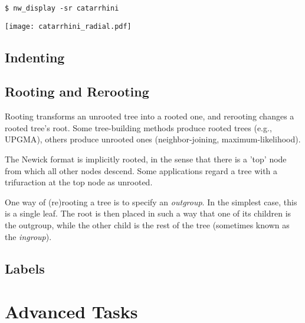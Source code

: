 \documentclass[a4paper,10pt]{report}
\begin{document}
\begin{verbatim}
$ nw_display -sr catarrhini
\end{verbatim}

\begin{center}
 \texttt{[image: catarrhini\_radial.pdf]}
\end{center}



\section{Indenting}
\label{sct_indent}

\section{Rooting and Rerooting}
\label{sct_reroot}

Rooting transforms an unrooted tree into a rooted one, and rerooting changes a rooted tree's root. Some tree-building methods produce rooted trees (e.g., \textsc{UPGMA}), others produce unrooted ones (neighbor-joining, maximum-likelihood). 

The Newick format is implicitly rooted, in the sense that there is a 'top' node from which all other nodes descend. Some applications regard a tree with a trifuraction at the top node as unrooted. 

One way of (re)rooting a tree is to specify an \textit{outgroup}. In the simplest case, this is a single leaf. The root is then placed in such a way that one of its children is the outgroup, while the other child is the rest of the tree (sometimes known as the \textit{ingroup}).

\section{Labels}

\chapter{Advanced Tasks}
\label{chap_adv}
\end{document}
